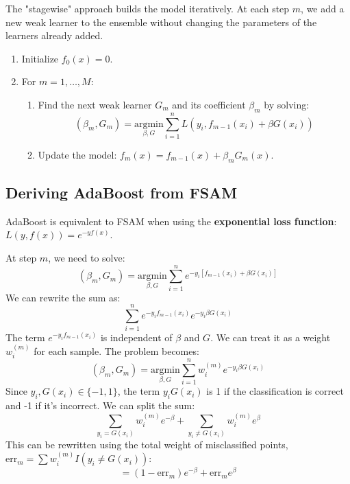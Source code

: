\documentclass{article}
\begin{document}
\begin{multicols}{2}
The "stagewise" approach builds the model iteratively. At each step $m$, we add a new weak learner to the ensemble without changing the parameters of the learners already added.
\begin{enumerate}
    \item Initialize $f_0(x) = 0$.
    \item For $m = 1, \dots, M$:
    \begin{enumerate}
        \item Find the next weak learner $G_m$ and its coefficient $\beta_m$ by solving:
        $$ (\beta_m, G_m) = \underset{\beta, G}{\text{argmin}} \sum_{i=1}^{n} L(y_i, f_{m-1}(x_i) + \beta G(x_i)) $$
        \item Update the model: $f_m(x) = f_{m-1}(x) + \beta_m G_m(x)$.
    \end{enumerate}
\end{enumerate}

\subsection{Deriving AdaBoost from FSAM}
AdaBoost is equivalent to FSAM when using the \textbf{exponential loss function}: $L(y, f(x)) = e^{-y f(x)}$.

At step $m$, we need to solve:
$$ (\beta_m, G_m) = \underset{\beta, G}{\text{argmin}} \sum_{i=1}^{n} e^{-y_i [f_{m-1}(x_i) + \beta G(x_i)]} $$
We can rewrite the sum as:
$$ \sum_{i=1}^{n} e^{-y_i f_{m-1}(x_i)} e^{-y_i \beta G(x_i)} $$
The term $e^{-y_i f_{m-1}(x_i)}$ is independent of $\beta$ and $G$. We can treat it as a weight $w_i^{(m)}$ for each sample. The problem becomes:
$$ (\beta_m, G_m) = \underset{\beta, G}{\text{argmin}} \sum_{i=1}^{n} w_i^{(m)} e^{-y_i \beta G(x_i)} $$
Since $y_i, G(x_i) \in \{-1, 1\}$, the term $y_i G(x_i)$ is 1 if the classification is correct and -1 if it's incorrect. We can split the sum:
$$ \sum_{y_i = G(x_i)} w_i^{(m)} e^{-\beta} + \sum_{y_i \neq G(x_i)} w_i^{(m)} e^{\beta} $$
This can be rewritten using the total weight of misclassified points, $\text{err}_m = \sum w_i^{(m)} I(y_i \neq G(x_i))$:
$$ = (1 - \text{err}_m) e^{-\beta} + \text{err}_m e^{\beta} $$


\end{multicols}
\end{document}
